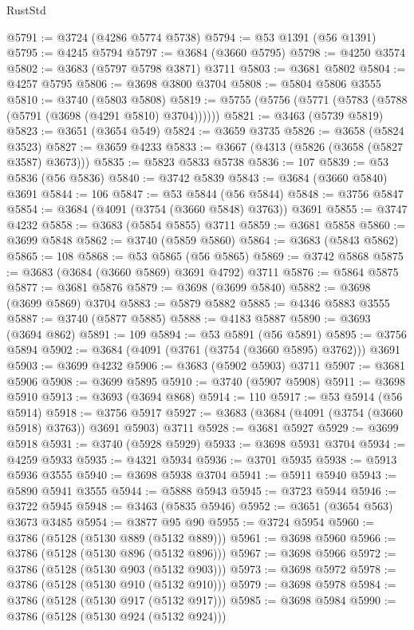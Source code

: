 \begin{lexlean}{RustStd}
\begin{coremodule}
@5791 := @3724 (@4286 @5774 @5738)
@5794 := @53 @1391 (@56 @1391)
@5795 := @4245 @5794
@5797 := @3684 (@3660 @5795)
@5798 := @4250 @3574
@5802 := @3683 (@5797 @5798 @3871) @3711
@5803 := @3681 @5802
@5804 := @4257 @5795
@5806 := @3698 @3800 @3704
@5808 := @5804 @5806 @3555
@5810 := @3740 (@5803 @5808)
@5819 := @5755 (@5756 (@5771 (@5783 (@5788 (@5791 (@3698 (@4291 @5810) @3704))))))
@5821 := @3463 (@5739 @5819)
@5823 := @3651 (@3654 @549)
@5824 := @3659 @3735
@5826 := @3658 (@5824 @3523)
@5827 := @3659 @4233
@5833 := @3667 (@4313 (@5826 (@3658 (@5827 @3587) @3673)))
@5835 := @5823 @5833 @5738
@5836 := 107
@5839 := @53 @5836 (@56 @5836)
@5840 := @3742 @5839
@5843 := @3684 (@3660 @5840) @3691
@5844 := 106
@5847 := @53 @5844 (@56 @5844)
@5848 := @3756 @5847
@5854 := @3684 (@4091 (@3754 (@3660 @5848) @3763)) @3691
@5855 := @3747 @4232
@5858 := @3683 (@5854 @5855) @3711
@5859 := @3681 @5858
@5860 := @3699 @5848
@5862 := @3740 (@5859 @5860)
@5864 := @3683 (@5843 @5862)
@5865 := 108
@5868 := @53 @5865 (@56 @5865)
@5869 := @3742 @5868
@5875 := @3683 (@3684 (@3660 @5869) @3691 @4792) @3711
@5876 := @5864 @5875
@5877 := @3681 @5876
@5879 := @3698 (@3699 @5840)
@5882 := @3698 (@3699 @5869) @3704
@5883 := @5879 @5882
@5885 := @4346 @5883 @3555
@5887 := @3740 (@5877 @5885)
@5888 := @4183 @5887
@5890 := @3693 (@3694 @862)
@5891 := 109
@5894 := @53 @5891 (@56 @5891)
@5895 := @3756 @5894
@5902 := @3684 (@4091 (@3761 (@3754 (@3660 @5895) @3762))) @3691
@5903 := @3699 @4232
@5906 := @3683 (@5902 @5903) @3711
@5907 := @3681 @5906
@5908 := @3699 @5895
@5910 := @3740 (@5907 @5908)
@5911 := @3698 @5910
@5913 := @3693 (@3694 @868)
@5914 := 110
@5917 := @53 @5914 (@56 @5914)
@5918 := @3756 @5917
@5927 := @3683 (@3684 (@4091 (@3754 (@3660 @5918) @3763)) @3691 @5903) @3711
@5928 := @3681 @5927
@5929 := @3699 @5918
@5931 := @3740 (@5928 @5929)
@5933 := @3698 @5931 @3704
@5934 := @4259 @5933
@5935 := @4321 @5934
@5936 := @3701 @5935
@5938 := @5913 @5936 @3555
@5940 := @3698 @5938 @3704
@5941 := @5911 @5940
@5943 := @5890 @5941 @3555
@5944 := @5888 @5943
@5945 := @3723 @5944
@5946 := @3722 @5945
@5948 := @3463 (@5835 @5946)
@5952 := @3651 (@3654 @563) @3673 @3485
@5954 := @3877 @95 @90
@5955 := @3724 @5954
@5960 := @3786 (@5128 (@5130 @889 (@5132 @889)))
@5961 := @3698 @5960
@5966 := @3786 (@5128 (@5130 @896 (@5132 @896)))
@5967 := @3698 @5966
@5972 := @3786 (@5128 (@5130 @903 (@5132 @903)))
@5973 := @3698 @5972
@5978 := @3786 (@5128 (@5130 @910 (@5132 @910)))
@5979 := @3698 @5978
@5984 := @3786 (@5128 (@5130 @917 (@5132 @917)))
@5985 := @3698 @5984
@5990 := @3786 (@5128 (@5130 @924 (@5132 @924)))

\end{coremodule}
\end{lexlean}

